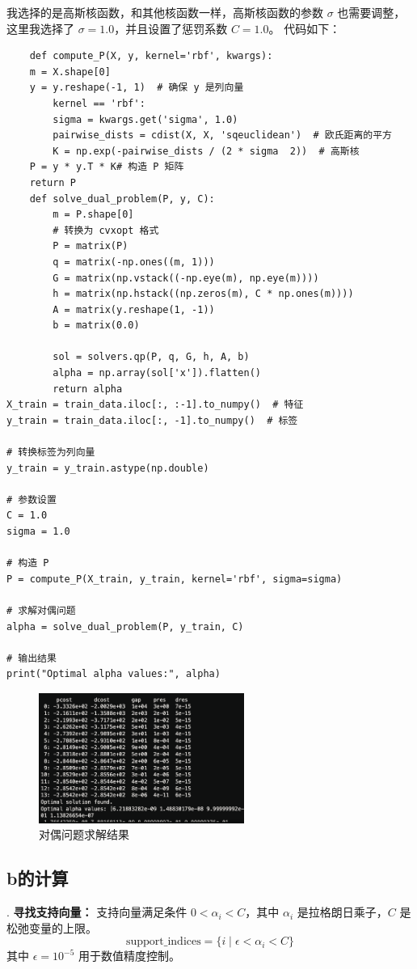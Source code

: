 \documentclass[12pt,a4paper,oneside]{article}
\begin{document}
我选择的是高斯核函数，和其他核函数一样，高斯核函数的参数 $\sigma$ 也需要调整，这里我选择了 $\sigma=1.0$，并且设置了惩罚系数 $C=1.0$。
代码如下：
\begin{lstlisting}
    def compute_P(X, y, kernel='rbf', kwargs):
    m = X.shape[0]
    y = y.reshape(-1, 1)  # 确保 y 是列向量
        kernel == 'rbf':
        sigma = kwargs.get('sigma', 1.0)
        pairwise_dists = cdist(X, X, 'sqeuclidean')  # 欧氏距离的平方
        K = np.exp(-pairwise_dists / (2 * sigma  2))  # 高斯核
    P = y * y.T * K# 构造 P 矩阵
    return P
    def solve_dual_problem(P, y, C):
        m = P.shape[0]
        # 转换为 cvxopt 格式
        P = matrix(P)
        q = matrix(-np.ones((m, 1)))
        G = matrix(np.vstack((-np.eye(m), np.eye(m))))
        h = matrix(np.hstack((np.zeros(m), C * np.ones(m))))
        A = matrix(y.reshape(1, -1))
        b = matrix(0.0)

        sol = solvers.qp(P, q, G, h, A, b)
        alpha = np.array(sol['x']).flatten()
        return alpha
X_train = train_data.iloc[:, :-1].to_numpy()  # 特征
y_train = train_data.iloc[:, -1].to_numpy()  # 标签

# 转换标签为列向量
y_train = y_train.astype(np.double)

# 参数设置
C = 1.0
sigma = 1.0

# 构造 P
P = compute_P(X_train, y_train, kernel='rbf', sigma=sigma)

# 求解对偶问题
alpha = solve_dual_problem(P, y_train, C)

# 输出结果
print("Optimal alpha values:", alpha)
    \end{lstlisting}

\begin{figure}[H]
    \centering
    \includegraphics[width=0.6\textwidth]{image/9.png}
    \caption{对偶问题求解结果}
\end{figure}
\subsection{b的计算}
. \textbf{寻找支持向量：}  
   支持向量满足条件 \( 0 < \alpha_i < C \)，其中 \( \alpha_i \) 是拉格朗日乘子，\( C \) 是松弛变量的上限。
   \[
   \text{support\_indices} = \{ i \mid \epsilon < \alpha_i < C \}
   \]
   其中 \(\epsilon = 10^{-5}\) 用于数值精度控制。  
\end{document}

